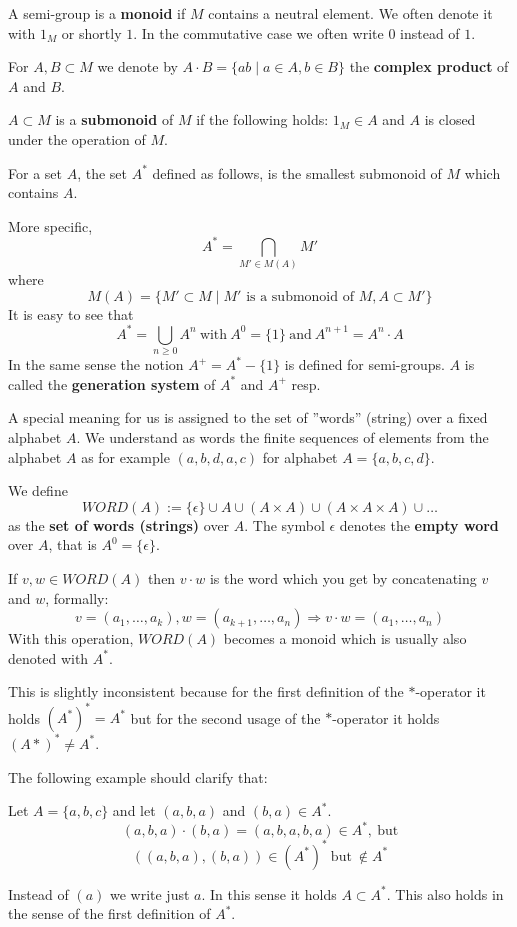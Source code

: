 A semi-group is a {\bf monoid} if $M$ contains a neutral element. We often
denote it with $1_M$ or shortly $1$. In the commutative case we often write $0$
instead of $1$.

For $A,B \subset M$ we denote by $A \cdot B = \{ a b \mid a \in A, b \in B \}$
the {\bf complex product} of $A$ and $B$.

$A \subset M$ is a {\bf submonoid} of $M$ if the following holds: $1_M \in A$
and $A$ is closed under the operation of $M$.

For a set $A$, the set $A^*$ defined as follows, is the smallest submonoid of
$M$ which contains $A$. 

More specific,
\[ A^* = \bigcap_{M' \in M(A)} M'	\]
where \[ M(A) = \{ M' \subset M \mid M' \mbox{ is a submonoid of } M, A \subset
M' \} \]
It is easy to see that
\[ A^* = \bigcup_{n \geq 0} A^n\ \mbox{with}\ A^0 = \{1\}\ \mbox{and}\ A^{n+1} =
A^n \cdot A \]
In the same sense the notion $A^+ = A^* - \{1\}$ is defined for semi-groups. $A$
is called the {\bf generation system} of $A^*$ and $A^+$ resp.

A special meaning for us is assigned to the set of ''words'' (string) over a
fixed alphabet $A$. We understand as words the finite sequences of elements from
the alphabet $A$ as for example $(a,b,d,a,c)$ for alphabet $A = \{ a,b,c,d \}$.

We define
\[
WORD(A) := \{\epsilon\} \cup A \cup (A \times A) \cup (A \times A \times A) \cup
\ldots
\]
as the {\bf set of words (strings)} over $A$. The symbol $\epsilon$ denotes the
{\bf empty word} over $A$, that is $A^0 = \{\epsilon\}$.

If $v, w \in WORD(A)$ then $v \cdot w$ is the word which you get by
concatenating $v$ and $w$, formally:
\[ v = (a_1,\ldots, a_k), w = (a_{k+1}, \ldots, a_n) \Rightarrow v \cdot
w = (a_1, \ldots, a_n) \]
With this operation, $WORD(A)$ becomes a monoid which is usually also denoted
with $A^*$. 

This is slightly inconsistent because for the first definition of
the $*$-operator it holds $(A^*)^* = A^*$ but for the second usage of the
$*$-operator it holds $(A*)^* \neq A^*$.

The following example should clarify that: 

Let $A = \{a,b,c\}$ and let $(a,b,a)$ and $(b,a) \in A^*$.
\[(a,b,a)\cdot(b,a) = (a,b,a,b,a) \in A^*,\ \mbox{but}\]
\[((a,b,a),(b,a)) \in (A^*)^*\ \mbox{but}\ \notin A^*\]

Instead of $(a)$ we write just $a$. In this sense it holds $A \subset A^*$. This
also holds in the sense of the first definition of $A^*$.

